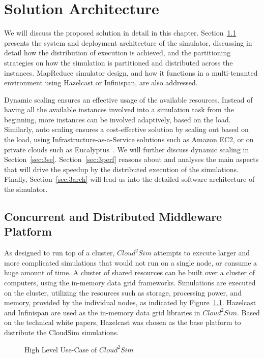 \chapter{Solution Architecture}
\label{chap:sa}
We will discuss the proposed solution in detail in this chapter. Section~\ref{sec:3con} presents the system and deployment architecture of the simulator, discussing in detail how the distribution of execution is achieved, and the partitioning strategies on how the simulation is partitioned and distributed across the instances. MapReduce simulator design, and how it functions in a multi-tenanted environment using Hazelcast or Infinispan, are also addressed. 

Dynamic scaling ensures an effective usage of the available resources. Instead of having all the available instances involved into a simulation task from the beginning, more instances can be involved adaptively, based on the load. Similarly, auto scaling ensures a cost-effective solution by scaling out based on the load, using Infrastructure-as-a-Service solutions such as Amazon EC2, or on private clouds such as Eucalyptus~\cite{nurmi2009eucalyptus}. We will further discuss dynamic scaling in Section~\ref{sec:3se}. Section~\ref{sec:3perf} reasons about and analyses the main aspects that will drive the speedup by the distributed execution of the simulations. Finally, Section~\ref{sec:3arch} will lead us into the detailed software architecture of the simulator.


\section{Concurrent and Distributed Middleware Platform}
\label{sec:3con}
As designed to run top of a cluster, $Cloud^{2}Sim$ attempts to execute larger and more complicated simulations that would not run on a single node, or consume a huge amount of time. A cluster of shared resources can be built over a cluster of computers, using the in-memory data grid frameworks. Simulations are executed on the cluster, utilizing the resources such as storage, processing power, and memory, provided by the individual nodes, as indicated by Figure~\ref{fig:datagrid}. Hazelcast and Infinispan are used as the in-memory data grid libraries in $Cloud^{2}Sim$. Based on the technical white papers, Hazelcast was chosen as the base platform to distribute the CloudSim simulations.

\begin{figure}[!htbp]
\begin{center}
\end{center}

 \caption{High Level Use-Case of $Cloud^{2}Sim$}
 \label{fig:datagrid}
\end{figure}

